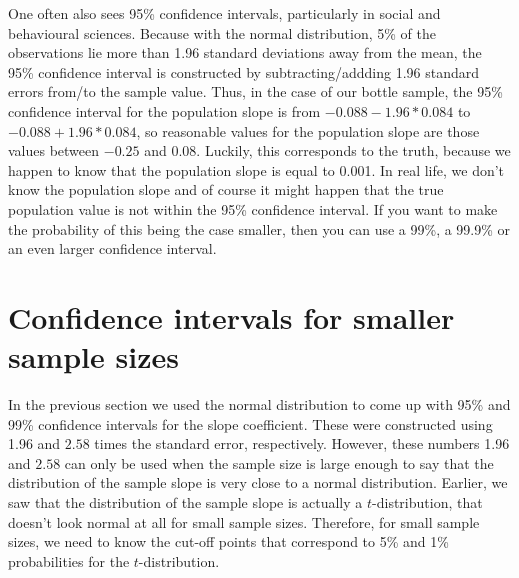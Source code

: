 \documentclass[]{report}\usepackage[]{graphicx}\usepackage[]{color}
\begin{document}
One often also sees 95\% confidence intervals, particularly in social and behavioural sciences. Because with the normal distribution, 5\% of the observations lie more than 1.96 standard deviations away from the mean, the 95\% confidence interval is constructed by subtracting/addding 1.96 standard errors from/to the sample value. Thus, in the case of our bottle sample, the 95\% confidence interval for the population slope is from $-0.088- 1.96* 0.084$ to $-0.088+ 1.96* 0.084$, so reasonable values for the population slope are those values between $-0.25$ and $0.08$. Luckily, this corresponds to the truth, because we happen to know that the population slope is equal to 0.001. In real life, we don't know the population slope and of course it might happen that the true population value is not within the 95\% confidence interval. If you want to make the probability of this being the case smaller, then you can use a 99\%, a 99.9\% or an even larger confidence interval.


\section{Confidence intervals for smaller sample sizes}

In the previous section we used the normal distribution to come up with 95\% and 99\% confidence intervals for the slope coefficient. These were constructed using 1.96 and $2.58$ times the standard error, respectively. However, these numbers 1.96 and $2.58$ can only be used when the sample size is large enough to say that the distribution of the sample slope is very close to a normal distribution. Earlier, we saw that the distribution of the sample slope is actually a $t$-distribution, that doesn't look normal at all for small sample sizes. Therefore, for small sample sizes, we need to know the cut-off points that correspond to 5\% and 1\% probabilities for the $t$-distribution.








\end{document}
